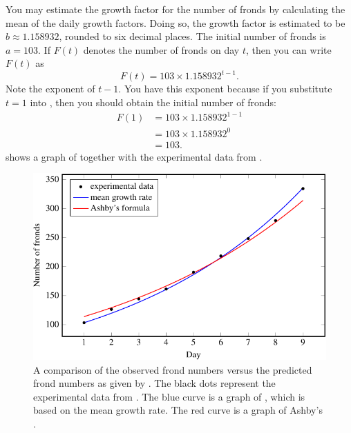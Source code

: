 \documentclass[a4paper,oneside,12pt]{article}
\begin{document}
\begin{problem}
{\begin{solution}
You may estimate the growth factor for the number of fronds by
calculating the mean of the daily growth factors.  Doing so, the
growth factor is estimated to be $b \approx 1.158932$, rounded to six
decimal places.  The initial number of fronds is $a = 103$.  If $F(t)$
denotes the number of fronds on day $t$, then you can write $F(t)$ as
\begin{equation}
\label{eqn:exponential:fronds_formula_average_growth_factor}
F(t)
=
103 \times 1.158932^{t - 1}.
\end{equation}
Note the exponent of $t - 1$.  You have this exponent because if you
substitute $t = 1$ into
, then
you should obtain the initial number of fronds:
\begin{align*}
F(1)
&=
103 \times 1.158932^{1 - 1} \\[4pt]
&=
103 \times 1.158932^0 \\[4pt]
&=
103.
\end{align*}
 shows a graph of
together with the experimental data from
.

\begin{figure}[!htbp]
\centering
\includegraphics[scale=1.1]{image/11/frond12-estimated-b.pdf}
\caption{%
  A comparison of the observed frond numbers versus the predicted
  frond numbers as given by
  .
  The black dots represent the experimental data from
  .  The blue curve is
  a graph of
  ,
  which is based on the mean growth rate.  The red curve is a graph of
  Ashby's .
}
\label{fig:exponential:frond12_theory_data}
\end{figure}


\end{solution}}
\end{problem}
\end{document}
